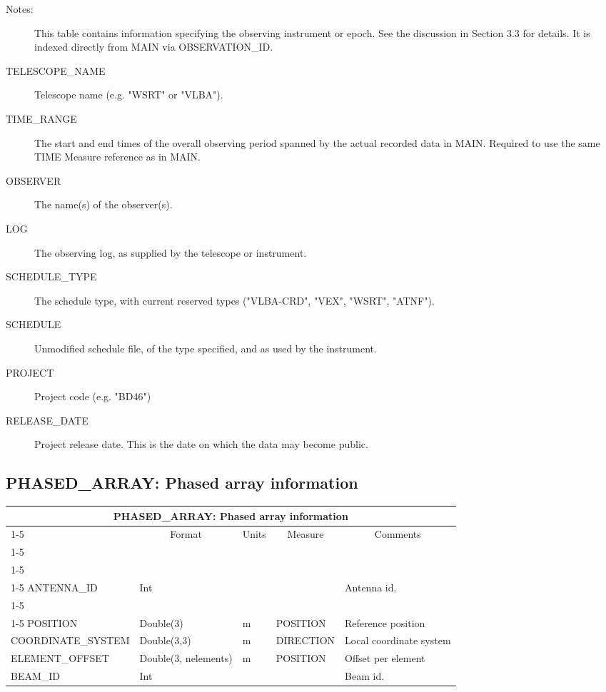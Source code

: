 \documentclass{article}
\newcommand{\defline}[1]{\cline{1-5}
\multicolumn{5}{|l|}{#1} \\
\cline{1-5}}
\newcommand{\definetable}[2]
{
	\vfill\newpage
	\subsection{#1}
        \vspace{0.15in}
        \small
	\begin{tabular}{|l|p{1.25in}|l|p{.9in}|p{1.4in}|}
	\hline
	\multicolumn{5}{|c|}{\bf #1}\\ 
	\cline{1-5}
        \multicolumn{1}{|c|}{Name}&\multicolumn{1}{|c|}{Format}&
        \multicolumn{1}{|c|}{Units}&\multicolumn{1}{|c|}{Measure}&
        \multicolumn{1}{|c|}{Comments}\\
        \cline{1-5}
        #2
        \hline
	\end{tabular}
}
\begin{document}
\begin{description}

\item[Notes:] This table contains information specifying the observing
instrument or epoch. See the discussion in Section 3.3 for details. It
is indexed directly from MAIN via OBSERVATION\_ID.

\item[TELESCOPE\_NAME] Telescope name (e.g. "WSRT" or "VLBA").

\item[TIME\_RANGE] The start and end times of the overall observing
period spanned by the actual recorded data in MAIN. Required to use
the same TIME Measure reference as in MAIN.

\item[OBSERVER] The name(s) of the observer(s).

\item[LOG] The observing log, as supplied by the telescope or instrument.

\item[SCHEDULE\_TYPE] The schedule type, with current reserved types
("VLBA-CRD", "VEX", "WSRT", "ATNF").

\item[SCHEDULE] Unmodified schedule file, of the type specified, and
as used by the instrument.

\item[PROJECT] Project code (e.g. "BD46")

\item[RELEASE\_DATE] Project release date. This is the date on which
the data may become public.

\end{description}

\definetable{PHASED\_ARRAY: Phased array information}{
\defline{\bf Columns}
\defline{\em Key}
ANTENNA\_ID  &  Int & & & Antenna id.\\
\defline{\em Data}
POSITION & Double(3) & m & POSITION & Reference position \\
COORDINATE\_SYSTEM & Double(3,3) & m & DIRECTION & Local coordinate system \\
ELEMENT\_OFFSET & Double(3, nelements) & m & POSITION & Offset per element \\
BEAM\_ID & Int & & & Beam id.\\
}
\begin{description}
\item
\end{description}
\end{document}
